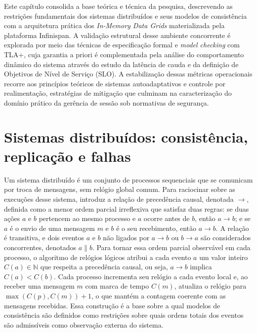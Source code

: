 Este capítulo consolida a base teórica e técnica da pesquisa, descrevendo as restrições fundamentais dos sistemas distribuídos e seus modelos de consistência com a arquitetura prática dos \emph{In-Memory Data Grids} materializada pela plataforma Infinispan. A validação estrutural desse ambiente concorrente é explorada por meio das técnicas de especificação formal e \emph{model checking} com TLA+, cuja garantia a priori é complementada pela análise do comportamento dinâmico do sistema através do estudo da latência de cauda e da definição de Objetivos de Nível de Serviço (SLO). A estabilização dessas métricas operacionais recorre aos princípios teóricos de sistemas autoadaptativos e controle por realimentação, estratégias de mitigação que culminam na caracterização do domínio prático da gerência de sessão sob normativas de segurança.

\section{Sistemas distribuídos: consistência, replicação e falhas}
\label{sec-fund-distrib}

Um sistema distribuído é um conjunto de processos sequenciais que se comunicam por troca de mensagens, sem relógio global comum. Para raciocinar sobre as execuções desse sistema, \citet{lamport_time_clocks_1978} introduz a relação de precedência causal, denotada $\to$, definida como a menor ordem parcial irreflexiva que satisfaz duas regras: se duas ações $a$ e $b$ pertencem ao mesmo processo e $a$ ocorre antes de $b$, então $a \to b$; e se $a$ é o envio de uma mensagem $m$ e $b$ é o seu recebimento, então $a \to b$. A relação é transitiva, e dois eventos $a$ e $b$ não ligados por $a \to b$ ou $b \to a$ são considerados concorrentes, denotados $a \parallel b$. Para tornar essa ordem parcial observável em cada processo, o algoritmo de relógios lógicos atribui a cada evento $a$ um valor inteiro $C(a) \in \mathbb{N}$ que respeita a precedência causal, ou seja, $a \to b$ implica $C(a) < C(b)$. Cada processo incrementa seu relógio a cada evento local e, ao receber uma mensagem $m$ com marca de tempo $C(m)$, atualiza o relógio para $\max(C(p), C(m)) + 1$, o que mantém a contagem coerente com as mensagens recebidas. Essa construção é a base sobre a qual modelos de consistência são definidos como restrições sobre quais ordens totais dos eventos são admissíveis como observação externa do sistema.

